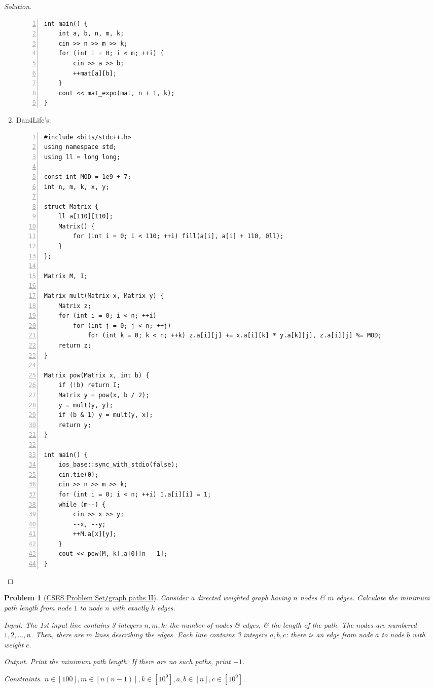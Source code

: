 \documentclass{article}
\newtheorem{problem}{Problem}
\begin{document}
\begin{proof}[Solution]
\begin{enumerate}
\begin{Verbatim}[numbers=left,xleftmargin=0mm]
int main() {
    int a, b, n, m, k;
    cin >> n >> m >> k;
    for (int i = 0; i < m; ++i) {
        cin >> a >> b;
        ++mat[a][b];
    }
    cout << mat_expo(mat, n + 1, k);
}
        \end{Verbatim}
        \item Dan4Life's:
        \begin{Verbatim}[numbers=left,xleftmargin=0mm]
#include <bits/stdc++.h>
using namespace std;
using ll = long long;

const int MOD = 1e9 + 7;
int n, m, k, x, y;

struct Matrix {
    ll a[110][110];
    Matrix() {
        for (int i = 0; i < 110; ++i) fill(a[i], a[i] + 110, 0ll);
    }
};

Matrix M, I;

Matrix mult(Matrix x, Matrix y) {
    Matrix z;
    for (int i = 0; i < n; ++i)
        for (int j = 0; j < n; ++j)
            for (int k = 0; k < n; ++k) z.a[i][j] += x.a[i][k] * y.a[k][j], z.a[i][j] %= MOD;
    return z;
}

Matrix pow(Matrix x, int b) {
    if (!b) return I;
    Matrix y = pow(x, b / 2);
    y = mult(y, y);
    if (b & 1) y = mult(y, x);
    return y;
}

int main() {
    ios_base::sync_with_stdio(false);
    cin.tie(0);
    cin >> n >> m >> k;
    for (int i = 0; i < n; ++i) I.a[i][i] = 1;
    while (m--) {
        cin >> x >> y;
        --x, --y;
        ++M.a[x][y];
    }
    cout << pow(M, k).a[0][n - 1];
}
        \end{Verbatim}
    \end{enumerate}
\end{proof}

\begin{problem}[\href{https://cses.fi/problemset/task/1724}{CSES Problem Set{\tt/}graph paths II}]
    Consider a directed weighted graph having $n$ nodes \& $m$ edges. Calculate the minimum path length from node $1$ to node $n$ with exactly $k$ edges.
    \item {\sf Input.} The 1st input line contains 3 integers $n,m,k$: the number of nodes \& edges, \& the length of the path. The nodes are numbered $1,2,\ldots,n$. Then, there are $m$ lines describing the edges. Each line contains 3 integers $a,b,c$: there is an edge from node $a$ to node $b$ with weight $c$.
    \item {\sf Output.} Print the minimum path length. If there are no such paths, print $-1$.
    \item {\sf Constraints.} $n\in[100],m\in[n(n - 1)],k\in[10^9],a,b\in[n],c\in[10^9]$.
\end{problem}
\end{document}
